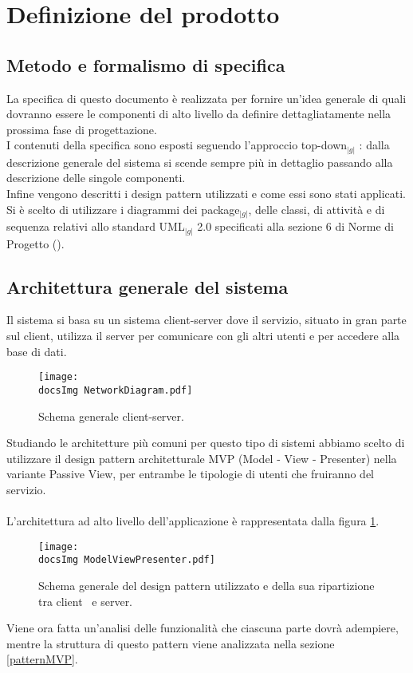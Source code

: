 \section{Definizione del prodotto}

\subsection{Metodo e formalismo di specifica}
\noindent La specifica di questo documento è realizzata per fornire un'idea generale di quali dovranno essere
le componenti di alto livello da definire dettagliatamente nella prossima fase di progettazione. \\
I contenuti della specifica sono esposti seguendo l'approccio top-down$_{|g|}$ : dalla descrizione generale del sistema si scende sempre più in dettaglio passando alla descrizione delle singole componenti. \\Infine vengono descritti i design pattern utilizzati e come essi sono stati applicati.\\
Si è scelto di utilizzare i diagrammi dei package$_{|g|}$, delle classi, di attività e di sequenza relativi allo standard UML$_{|g|}$ 2.0 specificati alla sezione 6 di Norme di Progetto (\textit{\NormeDiProgetto}).

\subsection{Architettura generale del sistema}\label{archSys}
\noindent Il sistema si basa su un sistema client-server dove il servizio, situato in gran parte sul client, utilizza il server per comunicare con gli altri utenti e per accedere alla base di dati.\\
	\begin{figure}[h!tbp]
		\centering
		\texttt{[image: \\docsImg NetworkDiagram.pdf]}
		\caption{Schema generale client-server.}
	\end{figure}
\noindent Studiando le architetture più comuni per questo tipo di sistemi abbiamo scelto di utilizzare il design pattern architetturale MVP (Model - View - Presenter) nella variante Passive View, per entrambe le tipologie di utenti che fruiranno del servizio.\\ \\ 
L'architettura ad alto livello dell'applicazione è rappresentata dalla figura \ref{fig:mvpAbstract}.\\
	\begin{figure}[h!tbp]
		\centering
		\texttt{[image: \\docsImg ModelViewPresenter.pdf]}
		\caption{Schema generale del design pattern utilizzato e della sua ripartizione tra client\g~ e server\g .}		
		\label{fig:mvpAbstract}
	\end{figure}
Viene ora fatta un'analisi delle funzionalità che ciascuna parte dovrà adempiere, mentre la struttura di questo pattern viene analizzata nella sezione \ref{patternMVP}.


